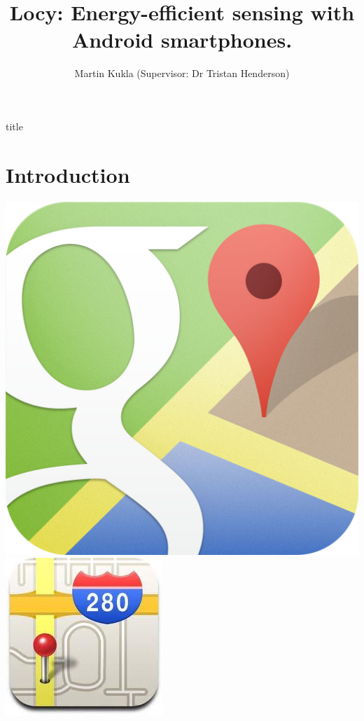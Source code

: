 \documentclass[a2,landscape]{a0poster}
\title{Locy: Energy-efficient sensing with Android smartphones.}
\author{Martin Kukla (Supervisor: Dr Tristan Henderson)}
\date{}
\begin{document}
\begin{staticcontents*}{title}
\maketitle	 
\end{staticcontents*}
\thispagestyle{empty}
\section*{Introduction}

\includegraphics[scale=0.08]{plots/logo_google_maps}
\includegraphics[scale=0.35]{plots/logo_apple_maps}
\end{document}
